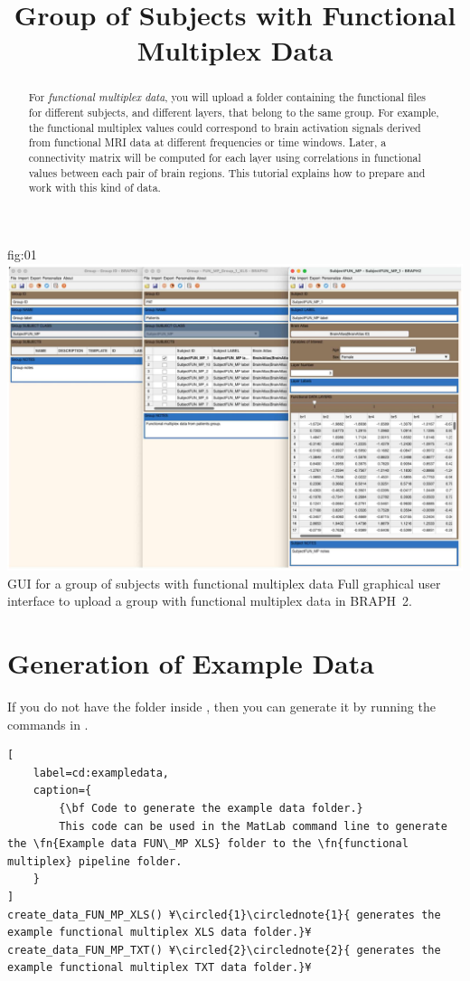 \documentclass[justified]{tufte-handout}
\title{Group of Subjects with Functional Multiplex Data}
\begin{document}
\maketitle

\begin{abstract}
\noindent
For \emph{functional multiplex data}, you will upload a folder containing the functional files for different subjects, and different layers, that belong to the same group. For example, the functional multiplex values could correspond to brain activation signals derived from functional MRI data at different frequencies or time windows.  Later, a connectivity matrix will be computed for each layer using correlations in functional values between each pair of brain regions. This tutorial explains how to prepare and work with this kind of data.
\end{abstract}


\tableofcontents

	{fig:01}
	{\includegraphics{fig01.jpg}}
	{GUI for a group of subjects with functional multiplex data}
	{
	Full graphical user interface to upload a group with functional multiplex data in BRAPH~2. 
	}

\clearpage
\section{Generation of Example Data}

If you do not have the  folder inside , then you can generate it by running the commands in .

\begin{lstlisting}[
	label=cd:exampledata,
	caption={
		{\bf Code to generate the example data folder.}
		This code can be used in the MatLab command line to generate the \fn{Example data FUN\_MP XLS} folder to the \fn{functional multiplex} pipeline folder.
	}
]
create_data_FUN_MP_XLS() ¥\circled{1}\circlednote{1}{ generates the example functional multiplex XLS data folder.}¥
create_data_FUN_MP_TXT() ¥\circled{2}\circlednote{2}{ generates the example functional multiplex TXT data folder.}¥
\end{lstlisting}
\end{document}
